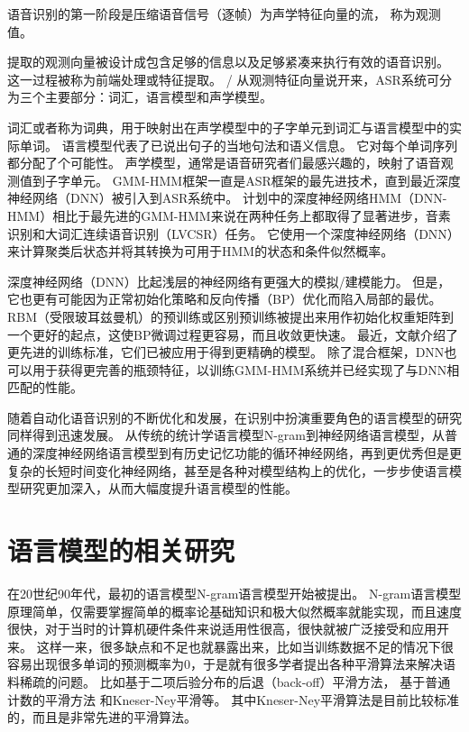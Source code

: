 语音识别的第一阶段是压缩语音信号（逐帧）为声学特征向量的流， 称为观测值。

提取的观测向量被设计成包含足够的信息以及足够紧凑来执行有效的语音识别。
这一过程被称为前端处理或特征提取。
/
从观测特征向量说开来，ASR系统可分为三个主要部分：词汇，语言模型和声学模型。

词汇或者称为词典，用于映射出在声学模型中的子字单元到词汇与语言模型中的实际单词。
语言模型代表了已说出句子的当地句法和语义信息。
它对每个单词序列都分配了个可能性。
声学模型，通常是语音研究者们最感兴趣的，映射了语音观测值到子字单元。
 GMM-HMM框架一直是ASR框架的最先进技术，直到最近深度神经网络（DNN）被引入到ASR系统中。
计划中的深度神经网络HMM（DNN-HMM）相比于最先进的GMM-HMM来说在两种任务上都取得了显著进步，音素识别\cite{mohamed2012acoustic}和大词汇连续语音识别（LVCSR）\cite{dahl2012context}任务。
它使用一个深度神经网络（DNN）来计算聚类后状态并将其转换为可用于HMM的状态和条件似然概率。


深度神经网络（DNN）比起浅层的神经网络有更强大的模拟/建模能力。
但是， 它也更有可能因为正常初始化策略和反向传播（BP）优化而陷入局部的最优。
RBM（受限玻耳兹曼机）的预训练\cite{mohamed2012acoustic}或区别预训练\cite{bengio2007greedy}被提出来用作初始化权重矩阵到一个更好的起点，这使BP微调过程更容易，而且收敛更快速。
最近，文献\cite{mohamed2010investigation}\cite{vesely2013sequence}介绍了更先进的训练标准，它们已被应用于得到更精确的模型。
除了混合框架，DNN也可以用于获得更完善的瓶颈特征\cite{yu2011improved}，以训练GMM-HMM系统并已经实现了与DNN相匹配的性能。


随着自动化语音识别的不断优化和发展，在识别中扮演重要角色的语言模型的研究同样得到迅速发展。
从传统的统计学语言模型N-gram到神经网络语言模型，从普通的深度神经网络语言模型到有历史记忆功能的循环神经网络，再到更优秀但是更复杂的长短时间变化神经网络，甚至是各种对模型结构上的优化，一步步使语言模型研究更加深入，从而大幅度提升语言模型的性能。



\section{语言模型的相关研究}
在20世纪90年代，最初的语言模型N-gram语言模型开始被提出。
N-gram语言模型原理简单，仅需要掌握简单的概率论基础知识和极大似然概率就能实现，而且速度很快，对于当时的计算机硬件条件来说适用性很高，很快就被广泛接受和应用开来。
这样一来，很多缺点和不足也就暴露出来，比如当训练数据不足的情况下很容易出现很多单词的预测概率为0，于是就有很多学者提出各种平滑算法来解决语料稀疏的问题。
比如基于二项后验分布的后退（back-off）平滑方法\cite{kawabata1996back}，
基于普通计数的平滑方法\cite{moore2009improved}
和Kneser-Ney平滑\cite{pickhardt2014generalized}等。
其中Kneser-Ney平滑算法是目前比较标准的，而且是非常先进的平滑算法。

